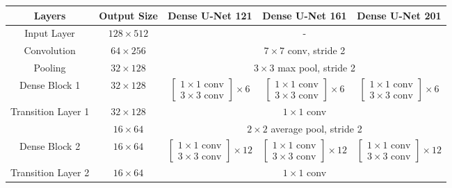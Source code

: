 \begin{table}[!ht]
    \centering
    \begin{tiny}
    \begin{tabular}{c|c|c|c|c}
        \toprule
        Layers & Output Size & Dense U-Net 121 & Dense U-Net 161 & Dense U-Net 201 \\
        \hline
        Input Layer & $128\times 512$ & \multicolumn{3}{c}{-}\\
        \hline
        Convolution & $64\times 256$ & \multicolumn{3}{c}{$7\times 7$ conv, stride 2} \\
        \hline
        Pooling & $32 \times 128$ & \multicolumn{3}{c}{$3\times 3$ max pool, stride 2} \\
        \hline
        Dense Block 1 & $32\times 128$ & $\begin{bmatrix}1\times 1 \text{ conv} \\3\times 3 \text{ conv} \end{bmatrix}\times 6$ & $\begin{bmatrix}1\times 1 \text{ conv} \\3\times 3 \text{ conv} \end{bmatrix}\times 6$ & $\begin{bmatrix}1\times 1 \text{ conv} \\3\times 3 \text{ conv} \end{bmatrix}\times 6$\\ 
        \hline
        \multirow{2}{*}{Transition Layer 1} & $32\times 128$ & \multicolumn{3}{c}{$1\times 1$ conv} \\
        \cline{2-5}
         & $16\times 64$ & \multicolumn{3}{c}{$2\times 2$ average pool, stride 2} \\
        \hline
        Dense Block 2 & $16\times 64$ & $\begin{bmatrix}1\times 1 \text{ conv} \\3\times 3 \text{ conv} \end{bmatrix}\times 12$ & $\begin{bmatrix}1\times 1 \text{ conv} \\3\times 3 \text{ conv} \end{bmatrix}\times 12$ & $\begin{bmatrix}1\times 1 \text{ conv} \\3\times 3 \text{ conv} \end{bmatrix}\times 12$ \\
        \hline
        \multirow{2}{*}{Transition Layer 2} & $16\times 64$ & \multicolumn{3}{c}{$1\times 1$ conv} \\

\end{tabular}
\end{tiny}
\end{table}
